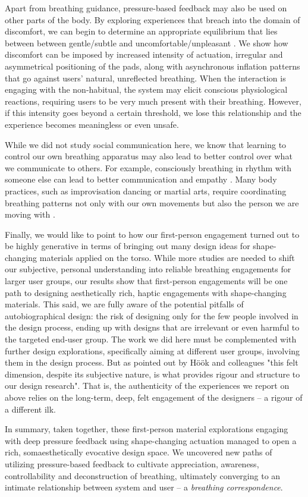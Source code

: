Apart from breathing guidance, pressure-based feedback may also be used on other parts of the body. By exploring experiences that breach into the domain of discomfort, we can begin to determine an appropriate equilibrium that lies between between gentle/subtle and uncomfortable/unpleasant \cite{benford_uncomfortable_2012}. We show how discomfort can be imposed by increased intensity of actuation, irregular and asymmetrical positioning of the pads, along with asynchronous inflation patterns that go against users' natural, unreflected breathing. When the interaction is engaging with the non-habitual, the system may elicit conscious physiological reactions, requiring users to be very much present with their breathing. However, if this intensity goes beyond a certain threshold, we lose this relationship and the experience becomes meaningless or even unsafe. 

While we did not study social communication here, we know that learning to control our own breathing apparatus may also lead to better control over what we communicate to others. For example, consciously breathing in rhythm with someone else can lead to better communication and empathy \cite{keller_rhythm_2014}. Many body practices, such as improvisation dancing or martial arts, require coordinating breathing patterns not only with our own movements but also the person we are moving with \cite{codrons_spontaneous_2014}. 

Finally, we would like to point to how our first-person engagement turned out to be highly generative in terms of bringing out many design ideas for shape-changing materials applied on the torso. While more studies are needed to shift our subjective, personal understanding into reliable breathing engagements for larger user groups, our results show that first-person engagements will be one path to designing aesthetically rich, haptic engagements with shape-changing materials. This said, we are fully aware of the potential pitfalls of autobiographical design: the risk of designing only for the few people involved in the design process, ending up with designs that are irrelevant or even harmful to the targeted end-user group. The work we did here must be complemented with further design explorations, specifically aiming at different user groups, involving them in the design process. But as pointed out by Höök and colleagues \cite{hook_embracing_2018} "this felt
dimension, despite its subjective nature, is what provides rigour and structure to our design research". That is, the authenticity of the experiences we report on above relies on the long-term, deep, felt engagement of the designers -- a rigour of a different ilk. 

In summary, taken together, these first-person material explorations engaging with deep pressure feedback using shape-changing actuation managed to open a rich, somaesthetically evocative design space. We uncovered new paths of utilizing pressure-based feedback to cultivate appreciation, awareness, controllability and deconstruction of breathing, ultimately converging to an intimate relationship between system and user -- a \textit{breathing correspondence}.